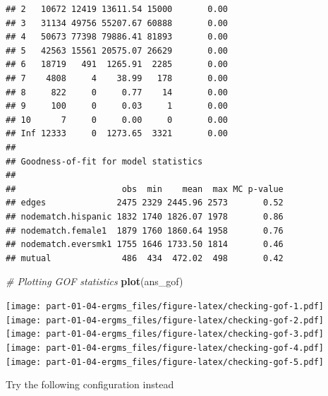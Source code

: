 \documentclass[]{book}
\newenvironment{Shaded}{\begin{snugshade}}{\end{snugshade}}
\newcommand{\CommentTok}[1]{\textcolor[rgb]{0.56,0.35,0.01}{\textit{#1}}}
\newcommand{\KeywordTok}[1]{\textcolor[rgb]{0.13,0.29,0.53}{\textbf{#1}}}
\newcommand{\NormalTok}[1]{#1}
\begin{document}
\begin{verbatim}
## 2   10672 12419 13611.54 15000       0.00
## 3   31134 49756 55207.67 60888       0.00
## 4   50673 77398 79886.41 81893       0.00
## 5   42563 15561 20575.07 26629       0.00
## 6   18719   491  1265.91  2285       0.00
## 7    4808     4    38.99   178       0.00
## 8     822     0     0.77    14       0.00
## 9     100     0     0.03     1       0.00
## 10      7     0     0.00     0       0.00
## Inf 12333     0  1273.65  3321       0.00
## 
## Goodness-of-fit for model statistics 
## 
##                     obs  min    mean  max MC p-value
## edges              2475 2329 2445.96 2573       0.52
## nodematch.hispanic 1832 1740 1826.07 1978       0.86
## nodematch.female1  1879 1760 1860.64 1958       0.76
## nodematch.eversmk1 1755 1646 1733.50 1814       0.46
## mutual              486  434  472.02  498       0.42
\end{verbatim}

\begin{Shaded}
\begin{Highlighting}[]
\CommentTok{# Plotting GOF statistics}
\KeywordTok{plot}\NormalTok{(ans_gof)}
\end{Highlighting}
\end{Shaded}

\texttt{[image: part-01-04-ergms\_files/figure-latex/checking-gof-1.pdf]} \texttt{[image: part-01-04-ergms\_files/figure-latex/checking-gof-2.pdf]} \texttt{[image: part-01-04-ergms\_files/figure-latex/checking-gof-3.pdf]} \texttt{[image: part-01-04-ergms\_files/figure-latex/checking-gof-4.pdf]} \texttt{[image: part-01-04-ergms\_files/figure-latex/checking-gof-5.pdf]}

Try the following configuration instead
\end{document}
